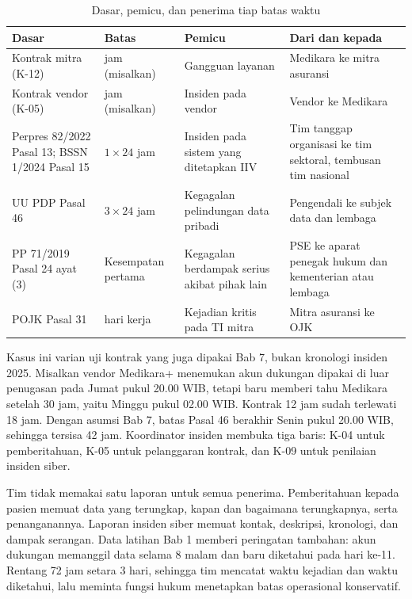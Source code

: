 \begin{table}[!htb]
  \centering\small
  \caption{Dasar, pemicu, dan penerima tiap batas waktu}\label{tab:ch03-jam}
  \begin{tabularx}{\textwidth}{|>{\raggedright\arraybackslash}p{}|>{\raggedright\arraybackslash}p{}|>{\raggedright\arraybackslash}X|>{\raggedright\arraybackslash}X|}
    \hline
    \textbf{Dasar} & \textbf{Batas} & \textbf{Pemicu} & \textbf{Dari dan kepada} \\ \hline
    Kontrak mitra (K-12) & 1 jam (misalkan) & Gangguan layanan & Medikara ke mitra asuransi \\ \hline
    Kontrak vendor (K-05) & 12 jam (misalkan) & Insiden pada vendor & Vendor ke Medikara \\ \hline
    Perpres 82/2022 Pasal 13; BSSN 1/2024 Pasal 15 & $1 \times 24$ jam & Insiden pada sistem yang
    ditetapkan IIV & Tim tanggap organisasi ke tim sektoral, tembusan tim nasional \\ \hline
    UU PDP Pasal 46 & $3 \times 24$ jam & Kegagalan pelindungan data pribadi & Pengendali ke subjek
    data dan lembaga \\ \hline
    PP 71/2019 Pasal 24 ayat (3) & Kesempatan pertama & Kegagalan berdampak serius akibat pihak lain
    & PSE ke aparat penegak hukum dan kementerian atau lembaga \\ \hline
    POJK Pasal 31 & 5 hari kerja & Kejadian kritis pada TI mitra & Mitra asuransi ke OJK \\ \hline
  \end{tabularx}
\end{table}

\begin{kasus}[title={Kasus Medikara Health: Satu Insiden Vendor, Beberapa Jam}]
Kasus ini varian uji kontrak yang juga dipakai Bab 7, bukan kronologi insiden 2025. Misalkan vendor
Medikara+ menemukan akun dukungan dipakai di luar penugasan pada Jumat pukul 20.00
WIB, tetapi baru memberi tahu Medikara setelah 30 jam, yaitu Minggu pukul 02.00 WIB. Kontrak 12 jam
sudah terlewati 18 jam. Dengan asumsi Bab 7, batas Pasal 46 berakhir Senin pukul 20.00 WIB, sehingga
tersisa 42 jam. Koordinator insiden membuka tiga baris: K-04 untuk pemberitahuan, K-05 untuk
pelanggaran kontrak, dan K-09 untuk penilaian insiden siber.

Tim tidak memakai satu laporan untuk semua penerima. Pemberitahuan kepada pasien memuat data yang
terungkap, kapan dan bagaimana terungkapnya, serta penanganannya. Laporan insiden siber memuat kontak,
deskripsi, kronologi, dan dampak serangan. Data latihan Bab 1 memberi peringatan tambahan: akun dukungan
memanggil data selama 8 malam dan baru diketahui pada hari ke-11. Rentang 72 jam setara 3 hari, sehingga
tim mencatat waktu kejadian dan waktu diketahui, lalu meminta fungsi hukum menetapkan batas operasional
konservatif.
\end{kasus}

